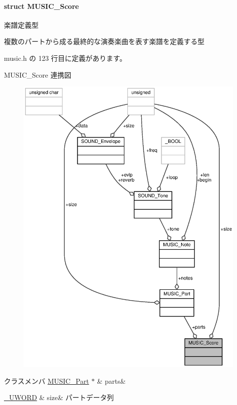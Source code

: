 \paragraph{struct M\+U\+S\+I\+C\+\_\+\+Score}
楽譜定義型 

複数のパートから成る最終的な演奏楽曲を表す楽譜を定義する型 

 music.\+h の 123 行目に定義があります。



M\+U\+S\+I\+C\+\_\+\+Score 連携図
\nopagebreak
\begin{figure}[H]
\begin{center}
\leavevmode
\includegraphics[width=350pt]{da/d34/structMUSIC__Score__coll__graph}
\end{center}
\end{figure}
\begin{DoxyFields}{クラスメンバ}
\hyperlink{music_8h_d2/d40/structMUSIC__Part}{M\+U\+S\+I\+C\+\_\+\+Part} $\ast$\label{music_8h_af4e6c89e5ceb122f4819e89a224a72e4}
&
parts&
\\
\hline

\hyperlink{stddef_8h_af4b45f5ec97da370bd2173b4fe891d76_af4b45f5ec97da370bd2173b4fe891d76}{\+\_\+\+U\+W\+O\+R\+D}\label{music_8h_a6cedd2913163d9b246021f1b9cc859d6}
&
size&
パートデータ列 \\
\hline

\end{DoxyFields}
\label{structMUSIC__Position}
